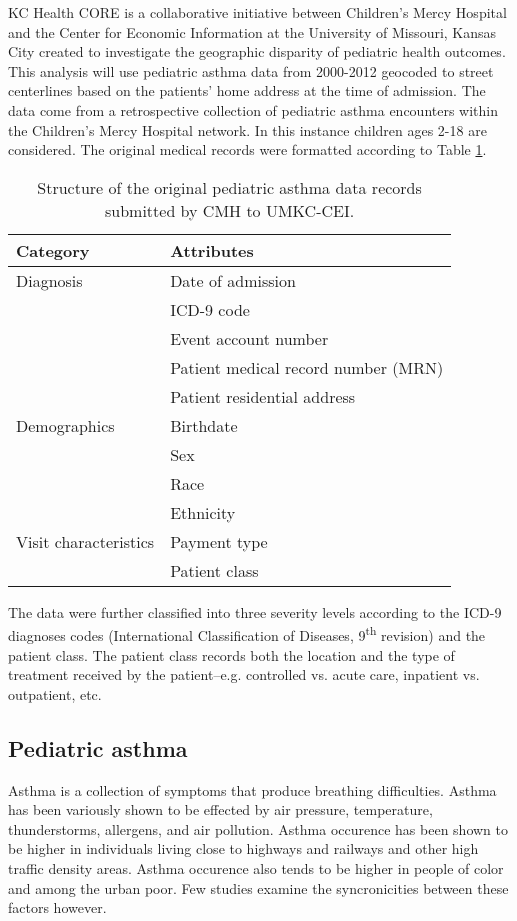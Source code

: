 KC Health CORE is a collaborative initiative between Children’s Mercy Hospital and the Center for Economic Information at the University of Missouri, Kansas City created to investigate the geographic disparity of pediatric health outcomes.
This analysis will use pediatric asthma data from 2000-2012 geocoded to street centerlines based on the patients’ home address at the time of admission.
The data come from a retrospective collection of pediatric asthma encounters within the Children’s Mercy Hospital network.
In this instance children ages 2-18 are considered. The original medical records were formatted according to Table \ref{tab:original-asthma-data}.
\begin{table}
	\caption{Structure of the original pediatric asthma data records submitted by CMH to UMKC-CEI. \label{tab:original-asthma-data}}
	\centering
	\begin{tabular}{ll}
		\toprule
		Category & Attributes \\
		\midrule
		Diagnosis & Date of admission \\
		& ICD-9 code \\
		& Event account number \\
		& Patient medical record number (MRN) \\
		& Patient residential address \\
		\midrule
		Demographics & Birthdate \\
		& Sex \\
		& Race \\
		& Ethnicity \\
		\midrule
		Visit characteristics & Payment type \\
		& Patient class \\
		\bottomrule
	\end{tabular}
\end{table}
The data were further classified into three severity levels according to the ICD-9 diagnoses codes (International Classification of Diseases, 9\textsuperscript{th} revision) and the patient class.
The patient class records both the location and the type of treatment received by the patient–e.g. controlled vs. acute care, inpatient vs. outpatient, etc.

\subsection{Pediatric asthma}

Asthma is a collection of symptoms that produce breathing difficulties.
Asthma has been variously shown to be effected by air pressure, temperature, thunderstorms, allergens, and air pollution.
 Asthma occurence has been shown to be higher in individuals living close to highways and railways and other high traffic density areas.
 Asthma occurence also tends to be higher in people of color and among the urban poor.
 Few studies examine the syncronicities between these factors however.

